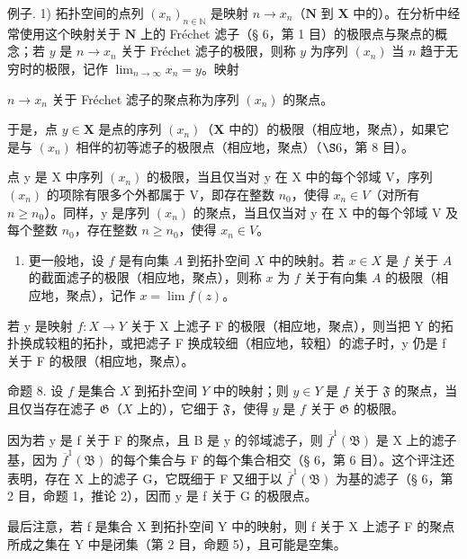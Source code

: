 例子. 1) 拓扑空间的点列 \((x_{n})_{n\in \mathbb{N}}\) 是映射 \(n\to x_n\)（\(\mathbf{N}\) 到 \(\mathbf{X}\) 中的）。在分析中经常使用这个映射关于 \(\mathbf{N}\) 上的 Fréchet 滤子（§ 6，第 1 目）的极限点与聚点的概念；若 \(y\) 是 \(n\to x_{n}\) 关于 Fréchet 滤子的极限，则称 \(y\) 为序列 \((x_{n})\) 当 \(n\) 趋于无穷时的极限，记作 \(\lim_{n\to \infty}x_n = y\)。映射

\(n \to x_{n}\) 关于 Fréchet 滤子的聚点称为序列 \((x_{n})\) 的聚点。

于是，点 \(y \in \mathbf{X}\) 是点的序列 \((x_n)\)（\(\mathbf{X}\) 中的）的极限（相应地，聚点），如果它是与 \((x_n)\) 相伴的初等滤子的极限点（相应地，聚点）（\(\S 6\)，第 8 目）。

点 y 是 X 中序列 \((x_{n})\) 的极限，当且仅当对 y 在 X 中的每个邻域 V，序列 \((x_{n})\) 的项除有限多个外都属于 V，即存在整数 \(n_{0}\)，使得 \(x_{n} \in V\)（对所有 \(n \geqslant n_{0}\)）。同样，y 是序列 \((x_{n})\) 的聚点，当且仅当对 y 在 X 中的每个邻域 V 及每个整数 \(n_{0}\)，存在整数 \(n \geqslant n_{0}\)，使得 \(x_{n} \in V\)。

\begin{enumerate}
\def\labelenumi{\arabic{enumi})}
\setcounter{enumi}{1}
\tightlist
\item
  更一般地，设 \(f\) 是有向集 \(A\) 到拓扑空间 \(X\) 中的映射。若 \(x \in X\) 是 \(f\) 关于 \(A\) 的截面滤子的极限（相应地，聚点），则称 \(x\) 为 \(f\) 关于有向集 \(A\) 的极限（相应地，聚点），记作 \(x = \lim f(z)\)。
\end{enumerate}

若 y 是映射 \(f: X \rightarrow Y\) 关于 X 上滤子 F 的极限（相应地，聚点），则当把 Y 的拓扑换成较粗的拓扑，或把滤子 F 换成较细（相应地，较粗）的滤子时，y 仍是 f 关于 F 的极限（相应地，聚点）。

命题 8. 设 \(f\) 是集合 \(X\) 到拓扑空间 \(Y\) 中的映射；则 \(y \in Y\) 是 \(f\) 关于 \(\mathfrak{F}\) 的聚点，当且仅当存在滤子 \(\mathfrak{G}\)（\(X\) 上的），它细于 \(\mathfrak{F}\)，使得 \(y\) 是 \(f\) 关于 \(\mathfrak{G}\) 的极限。

因为若 y 是 f 关于 F 的聚点，且 B 是 y 的邻域滤子，则 \(\overline{f}^{1}(\mathfrak{B})\) 是 X 上的滤子基，因为 \(\overline{f}^{1}(\mathfrak{B})\) 的每个集合与 F 的每个集合相交（§ 6，第 6 目）。这个评注还表明，存在 X 上的滤子 G，它既细于 F 又细于以 \(\overline{f}^{1}(\mathfrak{B})\) 为基的滤子（§ 6，第 2 目，命题 1，推论 2），因而 y 是 f 关于 G 的极限点。

最后注意，若 f 是集合 X 到拓扑空间 Y 中的映射，则 f 关于 X 上滤子 F 的聚点所成之集在 Y 中是闭集（第 2 目，命题 5），且可能是空集。

